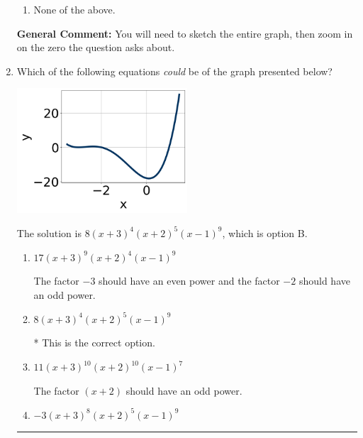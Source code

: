 \documentclass{extbook}[14pt]
\newcommand{\litem}[1]{\item #1

\rule{\textwidth}{0.4pt}}
\begin{document}
\begin{enumerate}
{\begin{enumerate}[label=\Alph*.]
\item None of the above.\end{enumerate}
\textbf{General Comment:} You will need to sketch the entire graph, then zoom in on the zero the question asks about.
}
\litem{
Which of the following equations \textit{could} be of the graph presented below?

\begin{center}
    \includegraphics[width=0.5\textwidth]{../Figures/polyGraphToFunctionCopyC.png}
\end{center}




The solution is \( 8(x + 3)^{4} (x + 2)^{5} (x - 1)^{9} \), which is option B.\begin{enumerate}[label=\Alph*.]
\item \( 17(x + 3)^{9} (x + 2)^{4} (x - 1)^{9} \)

The factor $-3$ should have an even power and the factor $-2$ should have an odd power.
\item \( 8(x + 3)^{4} (x + 2)^{5} (x - 1)^{9} \)

* This is the correct option.
\item \( 11(x + 3)^{10} (x + 2)^{10} (x - 1)^{7} \)

The factor $(x + 2)$ should have an odd power.
\item \( -3(x + 3)^{8} (x + 2)^{5} (x - 1)^{9} \)


\end{enumerate}}
\end{enumerate}
\end{document}
